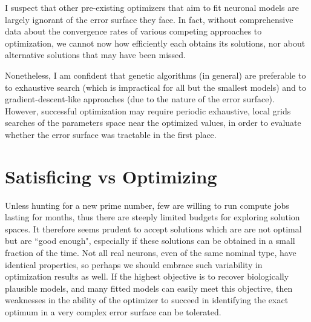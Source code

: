 
I suspect that other pre-existing optimizers that aim to fit neuronal models are largely ignorant of the error surface they face.
In fact, without comprehensive data about the convergence rates of various competing approaches to optimization, we cannot now how efficiently each obtains its solutions, nor about alternative solutions that may have been missed.

Nonetheless, I am confident that genetic algorithms (in general) are preferable to to exhaustive search (which is impractical for all but the smallest models) and to gradient-descent-like approaches (due to the nature of the error surface).
However, successful optimization may require periodic exhaustive, local grids searches of the parameters space near the optimized values, in order to evaluate whether the error surface was tractable in the first place.

\section{Satisficing vs Optimizing}
Unless hunting for a new prime number, few are willing to run compute jobs lasting for months, thus there are steeply limited budgets for exploring solution spaces. It therefore seems prudent to accept solutions which are are not optimal but are ``good enough", especially if these solutions can be obtained in a small fraction of the time.
Not all real neurons, even of the same nominal type, have identical properties, so perhaps we should embrace such variability in optimization results as well.
If the highest objective is to recover biologically plausible models, and many fitted models can easily meet this objective, then weaknesses in the ability of the optimizer to succeed in identifying the exact optimum in a very complex error surface can be tolerated.

